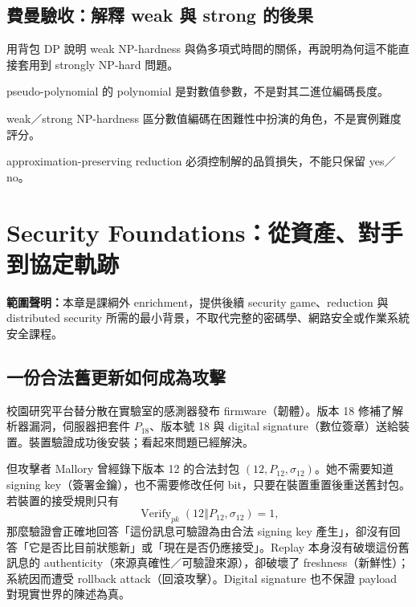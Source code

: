 \documentclass[11pt,a4paper,oneside,openany]{book}
\begin{document}
\section{費曼驗收：解釋 weak 與 strong 的後果}
\begin{feynmancheck}
用背包 DP 說明 weak NP-hardness 與偽多項式時間的關係，再說明為何這不能直接套用到 strongly NP-hard 問題。
\end{feynmancheck}
\begin{chapterrecap}
\item pseudo-polynomial 的 polynomial 是對數值參數，不是對其二進位編碼長度。
\item weak／strong NP-hardness 區分數值編碼在困難性中扮演的角色，不是實例難度評分。
\item approximation-preserving reduction 必須控制解的品質損失，不能只保留 yes／no。
\end{chapterrecap}

\chapter{Security Foundations：從資產、對手到協定軌跡}
\label{app:security-foundations}
\noindent\textbf{範圍聲明：}本章是課綱外 enrichment，提供後續 security game、reduction 與 distributed security 所需的最小背景，不取代完整的密碼學、網路安全或作業系統安全課程。

\section{一份合法舊更新如何成為攻擊}
校園研究平台替分散在實驗室的感測器發布 firmware（韌體）。版本 18 修補了解析器漏洞，伺服器把套件 $P_{18}$、版本號 18 與 digital signature（數位簽章）送給裝置。裝置驗證成功後安裝；看起來問題已經解決。

但攻擊者 Mallory 曾經錄下版本 12 的合法封包 $(12,P_{12},\sigma_{12})$。她不需要知道 signing key（簽署金鑰），也不需要修改任何 bit，只要在裝置重置後重送舊封包。若裝置的接受規則只有
\[
 \operatorname{Verify}_{pk}(12\mathbin\Vert P_{12},\sigma_{12})=1,
\]
那麼驗證會正確地回答「這份訊息可驗證為由合法 signing key 產生」，卻沒有回答「它是否比目前狀態新」或「現在是否仍應接受」。Replay 本身沒有破壞這份舊訊息的 authenticity（來源真確性／可驗證來源），卻破壞了 freshness（新鮮性）；系統因而遭受 rollback attack（回滾攻擊）。Digital signature 也不保證 payload 對現實世界的陳述為真。
\end{document}
